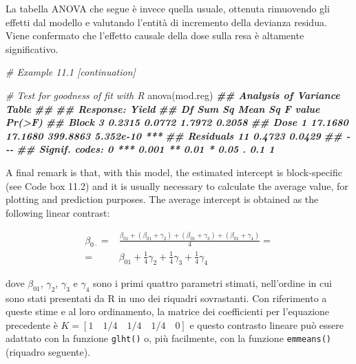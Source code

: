 \documentclass[
  12pt,
]{book}
\newenvironment{Shaded}{\begin{snugshade}}{\end{snugshade}}
\newcommand{\CommentTok}[1]{\textcolor[rgb]{0.56,0.35,0.01}{\textit{#1}}}
\newcommand{\DocumentationTok}[1]{\textcolor[rgb]{0.56,0.35,0.01}{\textbf{\textit{#1}}}}
\newcommand{\FunctionTok}[1]{\textcolor[rgb]{0.00,0.00,0.00}{#1}}
\newcommand{\NormalTok}[1]{#1}
\begin{document}
La tabella ANOVA che segue è invece quella usuale, ottenuta rimuovendo gli effetti dal modello e valutando l'entità di incremento della devianza residua. Viene confermato che l'effetto causale della dose sulla resa è altamente significativo.

\vspace{12pt}
\small

\begin{Shaded}
\begin{Highlighting}[]
\CommentTok{\# Example 11.1 [continuation]}

\CommentTok{\# Test for goodness of fit with R}
\FunctionTok{anova}\NormalTok{(mod.reg)}
\DocumentationTok{\#\# Analysis of Variance Table}
\DocumentationTok{\#\# }
\DocumentationTok{\#\# Response: Yield}
\DocumentationTok{\#\#           Df  Sum Sq Mean Sq  F value    Pr(\textgreater{}F)    }
\DocumentationTok{\#\# Block      3  0.2315  0.0772   1.7972    0.2058    }
\DocumentationTok{\#\# Dose       1 17.1680 17.1680 399.8863 5.352e{-}10 ***}
\DocumentationTok{\#\# Residuals 11  0.4723  0.0429                       }
\DocumentationTok{\#\# {-}{-}{-}}
\DocumentationTok{\#\# Signif. codes:  0 \textquotesingle{}***\textquotesingle{} 0.001 \textquotesingle{}**\textquotesingle{} 0.01 \textquotesingle{}*\textquotesingle{} 0.05 \textquotesingle{}.\textquotesingle{} 0.1 \textquotesingle{} \textquotesingle{} 1}
\end{Highlighting}
\end{Shaded}

\normalsize

A final remark is that, with this model, the estimated intercept is block-specific (see Code box 11.2) and it is usually necessary to calculate the average value, for plotting and prediction purposes. The average intercept is obtained as the following linear contrast:

\[{\begin{array}{rl}
\beta_{0\cdot} = & \frac{\beta_{01} + (\beta_{01} + \gamma_2) + (\beta_{01} + \gamma_3) + (\beta_{01} + \gamma_4)}{4} = \\ = &\beta_{01} + \frac{1}{4} \gamma_2 + \frac{1}{4}\gamma_3 + \frac{1}{4}\gamma_4
\end{array}}\]

dove \(\beta_{01}\), \(\gamma_2\), \(\gamma_3\) e \(\gamma_4\) sono i primi quattro parametri stimati, nell'ordine in cui sono stati presentati da R in uno dei riquadri sovrastanti. Con riferimento a queste stime e al loro ordinamento, la matrice dei coefficienti per l'equazione precedente è \(K = [1 \quad 1/4 \quad 1/4 \quad 1/4 \quad 0]\) e questo contrasto lineare può essere adattato con la funzione \texttt{glht()} o, più facilmente, con la funzione \texttt{emmeans()} (riquadro seguente).
\end{document}
